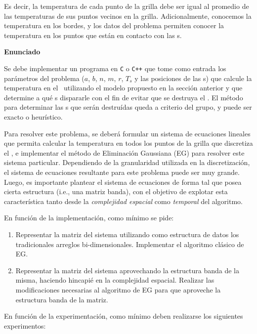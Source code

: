 \documentclass[spanish,a4paper]{article}
\begin{document}
Es decir, la temperatura de cada punto de la grilla debe ser igual al promedio de las tem\-pe\-ra\-tu\-ras de sus puntos vecinos en la grilla. Adicionalmente, conocemos la temperatura en los bordes, y los datos del problema permiten conocer la temperatura en los puntos que est\'an en contacto con las \atacante s.

{\noindent \bf Enunciado}

Se debe implementar un programa en \verb+C+ o \verb-C++- que tome como entrada los par\'ametros del problema ($a$, $b$, $n$, $m$, $r$, $T_s$ y las posiciones de las \atacante s) que calcule la temperatura en el \objeto\ utilizando el modelo propuesto en la secci\'on anterior y que determine a qu\'e \atacante s dispararle con el fin de evitar que se destruya el \objeto. El m\'etodo para determinar las \atacante s que ser\'an destru\'idas queda a criterio del grupo, y puede ser exacto o heur\'istico.

Para resolver este problema, se deber\'a formular un sistema de ecuaciones lineales que permita calcular la temperatura en todos los puntos de la grilla que discretiza el \objeto, e implementar el m\'etodo de Eliminaci\'on Gaussiana (EG) para resolver este sistema particular. Dependiendo de la granularidad utilizada en la discretizaci\'on, el sistema de ecuaciones resultante para este problema puede ser muy grande. Luego, es importante plantear el sistema de ecuaciones de forma tal que posea cierta estructura (i.e., una matriz banda), con el objetivo de explotar esta caracter\'istica tanto desde la \emph{complejidad espacial} como \emph{temporal} del algoritmo.

En funci\'on de la implementaci\'on, como m\'inimo se pide:
\begin{enumerate}
\item Representar la matriz del sistema utilizando como estructura de datos los tradicionales arreglos bi-dimensionales. Implementar el algoritmo cl\'asico de EG. \label{enum:EGcomun}
\item Representar la matriz del sistema aprovechando la estructura banda de la misma, haciendo hincapi\'e en la complejidad espacial.  Realizar las modificaciones necesarias al algoritmo de EG para que aproveche la estructura banda de la matriz. \label{enum:EGbanda}
\end{enumerate}

En funci\'on de la experimentaci\'on, como m\'inimo deben realizarse los siguientes experimentos:
\end{document}
